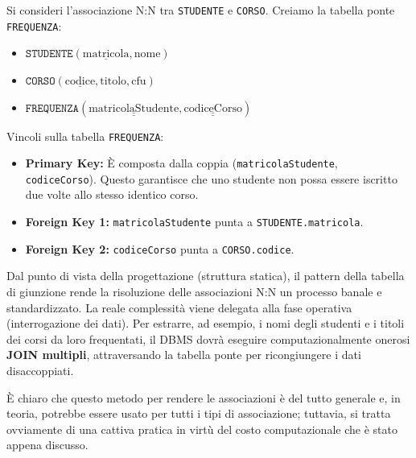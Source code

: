 \begin{example}
Si consideri l'associazione N:N tra \texttt{STUDENTE} e \texttt{CORSO}.
Creiamo la tabella ponte \texttt{FREQUENZA}:

\begin{itemize}
    \item $\texttt{STUDENTE}(\underline{\text{matricola}}, \text{nome})$
    \item $\texttt{CORSO}(\underline{\text{codice}}, \text{titolo}, \text{cfu})$
    \item $\texttt{FREQUENZA}(\underline{\underline{\text{matricolaStudente}}}, \underline{\underline{\text{codiceCorso}}})$
\end{itemize}

\medskip

Vincoli sulla tabella \texttt{FREQUENZA}:
\begin{itemize}
    \item \textbf{Primary Key:} È composta dalla coppia (\texttt{matricolaStudente}, \texttt{codiceCorso}). Questo garantisce che uno studente non possa essere iscritto due volte allo stesso identico corso.
    \item \textbf{Foreign Key 1:} \texttt{matricolaStudente} punta a \texttt{STUDENTE.matricola}.
    \item \textbf{Foreign Key 2:} \texttt{codiceCorso} punta a \texttt{CORSO.codice}.
\end{itemize}
\end{example}

\begin{observation}
Dal punto di vista della progettazione (struttura statica), il pattern della tabella di giunzione rende la risoluzione delle associazioni N:N un processo banale e standardizzato.
La reale complessità viene delegata alla fase operativa (interrogazione dei dati). Per estrarre, ad esempio, i nomi degli studenti e i titoli dei corsi da loro frequentati, il DBMS dovrà eseguire computazionalmente onerosi \textbf{JOIN multipli}, attraversando la tabella ponte per ricongiungere i dati disaccoppiati.

È chiaro che questo metodo per rendere le associazioni è del tutto generale e, in teoria, potrebbe essere usato per tutti i tipi di associazione; tuttavia, si tratta ovviamente di una cattiva pratica in virtù del costo computazionale che è stato appena discusso. 
\end{observation}

